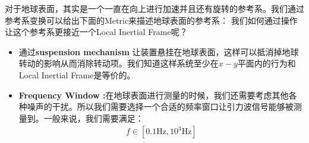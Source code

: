 对于地球表面，其实是一个一直在向上进行加速并且还有旋转的参考系。我们通过参考系变换可以给出下面的Metric来描述地球表面的参考系：
我们如何通过操作让这个参考系更接近一个Local Inertial Frame呢？
\begin{itemize}
  \item 通过\textbf{suspension mechanism} 让装置悬挂在地球表面，这样可以抵消掉地球转动的影响从而消除转动项。我们知道这样系统至少在$ x-y $平面内的行为和Local Inertial Frame是等价的。
\end{itemize}
\begin{itemize}
  \item \textbf{Frequency Window :}在地球表面进行测量的时候，我们还需要考虑其他各种噪声的干扰。所以我们需要选择一个合适的频率窗口让引力波信号能够被测量到。一般来说，我们需要满足：
    \begin{align}
      f \in [0.1 \mathrm{Hz}, 10^3 \mathrm{Hz}]
    \end{align}
\end{itemize}

\bigskip
{}

